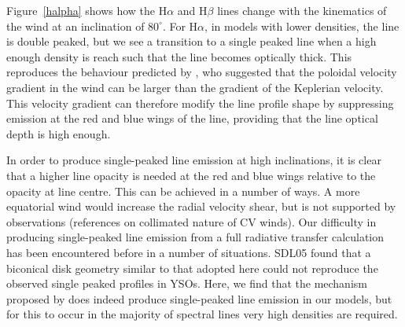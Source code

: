 \documentclass[preprint, a4paper, 11pt]{aastex}
\begin{document}


Figure~\ref{halpha} shows how the H$\alpha$ and H$\beta$ lines change with the kinematics 
of the wind at an inclination of $80^\circ$. For H$\alpha$, in models with lower densities, the
line is double peaked, but we see a transition to a single peaked line when 
a high enough density is reach such that the line becomes optically thick.
This reproduces the behaviour predicted by \cite{MC96}, who suggested that
the poloidal velocity gradient in the wind can be larger than the gradient of 
the Keplerian velocity. This velocity gradient can therefore modify the line profile shape
by suppressing emission at the red and blue wings of the line, 
providing that the line optical depth is high enough.

In order to produce single-peaked line emission at high inclinations,
it is clear that a higher line opacity is needed at the red and blue wings relative to
the opacity at line centre. This can be achieved in a number of ways. A more equatorial 
wind would increase the radial velocity shear, but is not supported by observations (references 
on collimated nature of CV winds).
Our difficulty in producing single-peaked line emission from a full 
radiative transfer calculation has been encountered before in a number of situations. 
SDL05 found that a biconical disk geometry similar to that adopted here could not reproduce 
the observed single peaked profiles in YSOs. Here, we find
that the mechanism proposed by \cite{MC96} does indeed produce 
single-peaked line emission in our models, but for this to occur in the majority of
spectral lines very high densities are required.   
\end{document}

